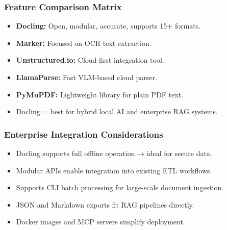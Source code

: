 \begin{frame}[fragile]\frametitle{Feature Comparison Matrix}
      \begin{itemize}
        \item \textbf{Docling:} Open, modular, accurate, supports 15+ formats.
        \item \textbf{Marker:} Focused on OCR text extraction.
        \item \textbf{Unstructured.io:} Cloud-first integration tool.
        \item \textbf{LlamaParse:} Fast VLM-based cloud parser.
        \item \textbf{PyMuPDF:} Lightweight library for plain PDF text.
        \item Docling = best for hybrid local AI and enterprise RAG systems.
      \end{itemize}
\end{frame}

\begin{frame}[fragile]\frametitle{Enterprise Integration Considerations}
      \begin{itemize}
        \item Docling supports full offline operation → ideal for secure data.
        \item Modular APIs enable integration into existing ETL workflows.
        \item Supports CLI batch processing for large-scale document ingestion.
        \item JSON and Markdown exports fit RAG pipelines directly.
        \item Docker images and MCP servers simplify deployment.
      \end{itemize}
\end{frame}

